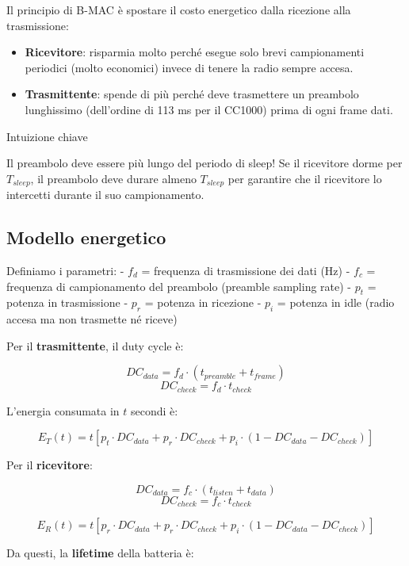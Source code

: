 \documentclass[
  italian,
  openany]{book}
\providecommand{\tightlist}{%
  \setlength{\itemsep}{0pt}\setlength{\parskip}{0pt}}
\begin{document}
Il principio di B-MAC è spostare il costo energetico dalla ricezione
alla trasmissione:

\begin{itemize}
\tightlist
\item
  \textbf{Ricevitore}: risparmia molto perché esegue solo brevi
  campionamenti periodici (molto economici) invece di tenere la radio
  sempre accesa.
\item
  \textbf{Trasmittente}: spende di più perché deve trasmettere un
  preambolo lunghissimo (dell'ordine di 113 ms per il CC1000) prima di
  ogni frame dati.
\end{itemize}

\begin{callouttip}{Intuizione chiave}

Il preambolo deve essere più lungo del periodo di sleep! Se il
ricevitore dorme per \(T_{sleep}\), il preambolo deve durare almeno
\(T_{sleep}\) per garantire che il ricevitore lo intercetti durante il
suo campionamento.

\end{callouttip}

\subsection{Modello energetico}\label{modello-energetico}

Definiamo i parametri: - \(f_d\) = frequenza di trasmissione dei dati
(Hz) - \(f_c\) = frequenza di campionamento del preambolo (preamble
sampling rate) - \(p_t\) = potenza in trasmissione - \(p_r\) = potenza
in ricezione - \(p_i\) = potenza in idle (radio accesa ma non trasmette
né riceve)

Per il \textbf{trasmittente}, il duty cycle è:

\[DC_{data} = f_d \cdot (t_{preamble} + t_{frame})\]
\[DC_{check} = f_d \cdot t_{check}\]

L'energia consumata in \(t\) secondi è:

\[E_T(t) = t \left[ p_t \cdot DC_{data} + p_r \cdot DC_{check} + p_i \cdot (1 - DC_{data} - DC_{check}) \right]\]

Per il \textbf{ricevitore}:

\[DC_{data} = f_c \cdot (t_{listen} + t_{data})\]
\[DC_{check} = f_c \cdot t_{check}\]

\[E_R(t) = t \left[ p_r \cdot DC_{data} + p_r \cdot DC_{check} + p_i \cdot (1 - DC_{data} - DC_{check}) \right]\]

Da questi, la \textbf{lifetime} della batteria è:
\end{document}
